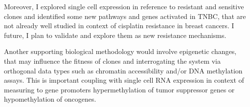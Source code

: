 
Moreover, I explored single cell expression in reference to resistant and sensitive clones and identified some new pathways and genes activated in TNBC, that are not already well studied in context of cisplatin resistance in breast cancers. I future, I plan to validate and explore them as new resistance mechanisms.



Another supporting biological methodology would involve epigenetic changes, that may influence the fitness of clones and interrogating the system via orthogonal data types such as chromatin accessibility and/or DNA methylation assays. This is important coupling with single cell RNA expression in context of measuring to gene promoters hypermethylation of tumor suppressor genes  or hypomethylation of oncogenes.









 




